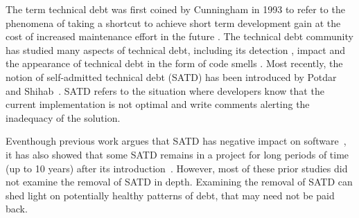 
The term technical debt was first coined by Cunningham in 1993 to refer to the phenomena of taking a shortcut to achieve short term development gain at the cost of increased maintenance effort in the future \cite{Cunningham1992WPM}. The technical debt community has studied many aspects of technical debt, including its detection \cite{Zazworka2013EASE}, impact \cite{Zazworka2011MTD} and the appearance of technical debt in the form of code smells \cite{Fontana2012MTD}. 
Most recently, the notion of self-admitted technical debt (SATD) has been introduced by Potdar and Shihab~\cite{Potdar2014ICSME}.
SATD refers to the situation where developers know that the current implementation is not optimal and write comments alerting the inadequacy of the solution.



Eventhough previous work argues that SATD has negative impact on software~\cite{Wehaibi2016SANER,kameiusingTDA2016}, it has also showed that some SATD remains in a project for long periods of time (up to 10 years) after its introduction~\cite{Potdar2014ICSME}. However, most of these prior studies did not examine the removal of SATD in depth. Examining the removal of SATD can shed light on potentially healthy patterns of debt, that may need not be paid back.


